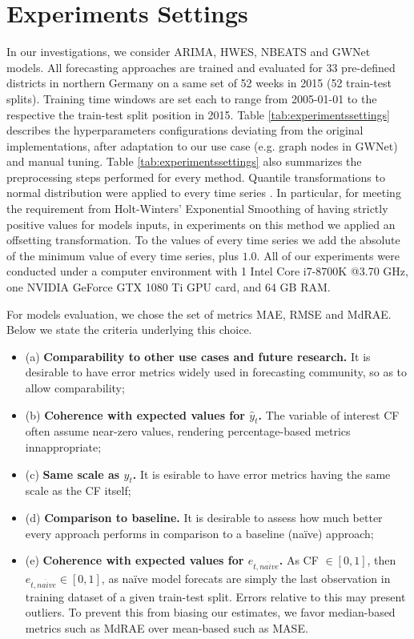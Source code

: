 \chapter{Experiments Settings}\label{chap:experiments}
In our investigations, we consider ARIMA, HWES, NBEATS and GWNet models.
All forecasting approaches are trained and evaluated for 33 pre-defined districts in northern Germany on a same set of 52 weeks in 2015 (52 train-test splits).
Training time windows are set each to range from 2005-01-01 to the respective the train-test split position in 2015.
Table \ref{tab:experimentssettings} describes the hyperparameters configurations deviating from the original implementations, after adaptation to our use case (e.g. graph nodes in GWNet) and manual tuning.
Table \ref{tab:experimentssettings} also summarizes the preprocessing steps performed for every method.
Quantile transformations \cite{sklearnQtransform} to normal distribution were applied to every time series \cite{sklearnQtransform}.
In particular, for meeting the requirement from Holt-Winters' Exponential Smoothing of having strictly positive values for models inputs, in experiments on this method we applied an offsetting transformation.
To the values of every time series we add the absolute of the minimum value of every time series, plus $1.0$.
All of our experiments were conducted under a computer environment with 1 Intel Core i7-8700K @3.70 GHz, one NVIDIA GeForce GTX 1080 Ti GPU card, and 64 GB RAM.

For models evaluation, we chose the set of metrics MAE, RMSE and MdRAE.
Below we state the criteria underlying this choice.
\begin{itemize}
    \item (a) \textbf{Comparability to other use cases and future research.} It is desirable to have error metrics widely used in forecasting community, so as to allow comparability;
    \item (b) \textbf{Coherence with expected values for $\hat{y}_t$.} The variable of interest CF often assume near-zero values, rendering percentage-based metrics innappropriate;
    \item (c) \textbf{Same scale as $y_t$.} It is esirable to have error metrics having the same scale as the CF itself;
    \item (d) \textbf{Comparison to baseline.} It is desirable to assess how much better every approach performs in comparison to a baseline (naïve) approach;
    \item (e) \textbf{Coherence with expected values for $e_{t, na\ddot{i}ve}$.} As CF $\in [0, 1]$, then $e_{t, na\ddot{i}ve} \in [0, 1]$, as naïve model forecats are simply the last observation in training dataset of a given train-test split.
    Errors relative to this may present outliers.
    To prevent this from biasing our estimates, we favor median-based metrics such as MdRAE over mean-based such as MASE.
\end{itemize}

